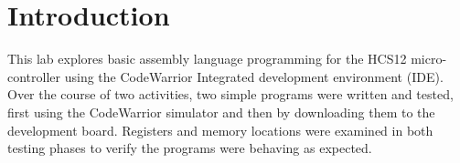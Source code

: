 \section{Introduction}

This lab explores basic assembly language programming for the HCS12 %
micro-controller using the CodeWarrior Integrated development environment (IDE).
Over the course of two activities, two simple programs were written and tested, first using the CodeWarrior simulator and then by downloading them to the development board.
Registers and memory locations were examined in both testing phases to verify the programs were behaving as expected.
